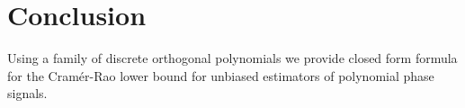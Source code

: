 \documentclass[journal,10pt]{IEEEtran}
\begin{document}




 
\section{Conclusion}

Using a family of discrete orthogonal polynomials we provide closed form formula for the Cram\'{e}r-Rao lower bound for unbiased estimators of polynomial phase signals.


%
\small 

 
 
\end{document}
